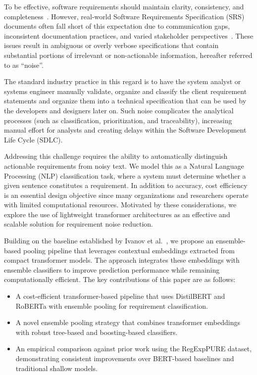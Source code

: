 \documentclass[sigconf,review]{acmart}
\begin{document}
To be effective, software requirements should maintain clarity, consistency, and completeness~\cite{wiegers2013software}. However, real-world Software Requirements Specification (SRS) documents often fall short of this expectation due to communication gaps, inconsistent documentation practices, and varied stakeholder perspectives~\cite{nuseibeh2000requirements}. These issues result in ambiguous or overly verbose specifications that contain substantial portions of irrelevant or non-actionable information, hereafter referred to as ``noise''. 

The standard industry practice in this regard is to have the system analyst or systems engineer manually validate, organize and classify the client requirement statements and organize them into a technical specification that can be used by the developers and designers later on. Such noise complicates the analytical processes (such as classification, prioritization, and traceability), increasing manual effort for analysts and creating delays within the Software Development Life Cycle (SDLC).

Addressing this challenge requires the ability to automatically distinguish actionable requirements from noisy text. We model this as a Natural Language Processing (NLP) classification task, where a system must determine whether a given sentence constitutes a requirement. In addition to accuracy, cost efficiency is an essential design objective since many organizations and researchers operate with limited computational resources. Motivated by these considerations, we explore the use of lightweight transformer architectures as an effective and scalable solution for requirement noise reduction.

Building on the baseline established by Ivanov et al.~\cite{ivanov2021regexppure}, we propose an ensemble-based pooling pipeline that leverages contextual embeddings extracted from compact transformer models. The approach integrates these embeddings with ensemble classifiers to improve prediction performance while remaining computationally efficient. The key contributions of this paper are as follows:

\begin{itemize}
    \item A cost-efficient transformer-based pipeline that uses DistilBERT and RoBERTa with ensemble pooling for requirement classification.
    \item A novel ensemble pooling strategy that combines transformer embeddings with robust tree-based and boosting-based classifiers.
    \item An empirical comparison against prior work using the RegExpPURE dataset, demonstrating consistent improvements over BERT-based baselines and traditional shallow models.
\end{itemize}
\end{document}

